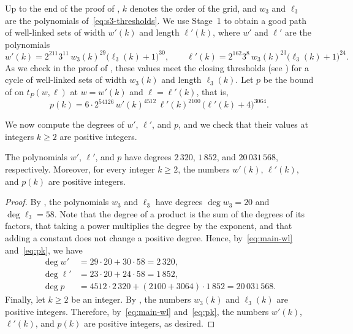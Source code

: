 \documentclass[fontsize=12pt,leading=14pt]{fullpaper}
\begin{document}
Up to the end of the proof of , $k$ denotes the order of the grid, and $w_3$ and $\ell_3$ are the polynomials of~\eqref{eq:s3-thresholds}.
We use Stage~1 to obtain a good path of well-linked sets of width $w'(k)$ and length $\ell'(k)$, where $w'$ and $\ell'$ are the polynomials
\begin{equation}\label{eq:main-wl}
  w'(k)=2^{211}3^{11}\,w_3(k)^{29}\bigl(\ell_3(k)+1\bigr)^{30},\qquad\ell'(k)=2^{162}3^{8}\,w_3(k)^{23}\bigl(\ell_3(k)+1\bigr)^{24}.
\end{equation}
As we check in the proof of , these values meet the closing thresholds (see ) for a cycle of well-linked sets of width $w_3(k)$ and length $\ell_3(k)$.
Let $p$ be the bound of  on $t_P(w,\ell)$ at $w=w'(k)$ and $\ell=\ell'(k)$, that is,
\begin{equation}\label{eq:pk}
  p(k)=6\cdot2^{54126}\,w'(k)^{4512}\,\ell'(k)^{2100}\,\bigl(\ell'(k)+4\bigr)^{3064}.
\end{equation}

We now compute the degrees of $w'$, $\ell'$, and $p$, and we check that their values at integers $k\ge2$ are positive integers.

\begin{lemma}\label{lem:pk-degree}
  The polynomials $w'$, $\ell'$, and $p$ have degrees $2\,320$, $1\,852$, and $20\,031\,568$, respectively.
  Moreover, for every integer $k\ge2$, the numbers $w'(k)$, $\ell'(k)$, and $p(k)$ are positive integers.
\end{lemma}

\begin{proof}
  By , the polynomials $w_3$ and $\ell_3$ have degrees $\deg w_3=20$ and $\deg\ell_3=58$.
  Note that the degree of a product is the sum of the degrees of its factors, that taking a power multiplies the degree by the exponent, and that adding a constant does not change a positive degree.
  Hence, by~\eqref{eq:main-wl} and~\eqref{eq:pk}, we have
  \begin{align*}
    \deg w'&=29\cdot20+30\cdot58=2\,320,\\
    \deg\ell'&=23\cdot20+24\cdot58=1\,852,\\
    \deg p&=4512\cdot2\,320+(2100+3064)\cdot1\,852=20\,031\,568.
  \end{align*}
  Finally, let $k\ge2$ be an integer.
  By , the numbers $w_3(k)$ and $\ell_3(k)$ are positive integers.
  Therefore, by~\eqref{eq:main-wl} and~\eqref{eq:pk}, the numbers $w'(k)$, $\ell'(k)$, and $p(k)$ are positive integers, as desired.
\end{proof}
\end{document}
